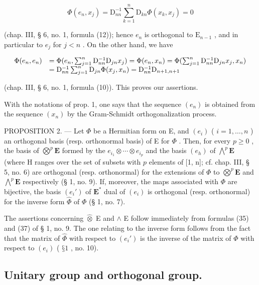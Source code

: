 \[
\Phi (e _ {n}, x _ {j}) = \mathrm{D} _ {n n} ^ {- 1} \sum_ {k = 1} ^ {n} \mathrm{D} _ {k n} \Phi (x _ {k}, x _ {j}) = 0
\]

(chap. III, § 6, no. 1, formula (12)); hence \(e_n\) is orthogonal to \(\mathrm{E}_{n-1}\) , and in particular to \(e_j\) for \(j < n\) . On the other hand, we have

\[
\begin{array}{r l} \Phi (e _ {n}, e _ {n}) & = \Phi (e _ {n}, \sum_ {j = 1} ^ {n} \mathrm{D} _ {n n} ^ {- 1} \mathrm{D} _ {j n} x _ {j}) = \Phi (e _ {n}, x _ {n}) = \Phi (\sum_ {j = 1} ^ {n} \mathrm{D} _ {n n} ^ {- 1} \mathrm{D} _ {j n} x _ {j}, x _ {n}) \\ & = \mathrm{D} _ {n n} ^ {- 1} \sum_ {j = 1} ^ {n} \mathrm{D} _ {j n} \Phi (x _ {j}, x _ {n}) = \mathrm{D} _ {n n} ^ {- 1} \mathrm{D} _ {n + 1, n + 1} \end{array}
\]

(chap. III, § 6, no. 1, formula (10)). This proves our assertions.

With the notations of prop. 1, one says that the sequence \((e_n)\) is obtained from the sequence \((x_n)\) by the Gram-Schmidt orthogonalization process.

PROPOSITION 2. --- Let \(\Phi\) be a Hermitian form on E, and \((e_i)\) ( \(i = 1, \ldots, n\) ) an orthogonal basis (resp. orthonormal basis) of E for \(\Phi\) . Then, for every \(p \geqslant 0\) , the basis of \(\bigotimes^{p} \mathbf{E}\) formed by the \(e_{i_1} \otimes \cdots \otimes e_{i_p}\) and the basis \((e_h)\) of \(\bigwedge^{p} \mathbf{E}\) (where H ranges over the set of subsets with \(p\) elements of {[}1, n{]}; cf. chap. III, § 5, no. 6) are orthogonal (resp. orthonormal) for the extensions of \(\Phi\) to \(\bigotimes^{p} \mathbf{E}\) and \(\bigwedge^{p} \mathbf{E}\) respectively (§ 1, no. 9). If, moreover, the maps associated with \(\Phi\) are bijective, the basis \((e_i')\) of \(\mathbf{E}^*\) dual of \((e_i)\) is orthogonal (resp. orthonormal) for the inverse form \(\hat{\Phi}\) of \(\Phi\) (§ 1, no. 7).

The assertions concerning \(\widehat{\otimes}\) E and \(\wedge\) E follow immediately from formulas (35) and (37) of § 1, no. 9. The one relating to the inverse form follows from the fact that the matrix of \(\widehat{\Phi}\) with respect to \((e_i')\) is the inverse of the matrix of \(\Phi\) with respect to \((e_i)\) ( \(§ 1\) , no. 10).

\subsection{Unitary group and orthogonal group.}

